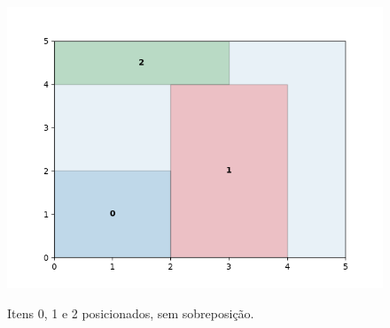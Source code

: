 \begin{figure}[H]
    \centering
    \caption{Itens 0, 1 e 2 posicionados, sem sobreposição.}
    \includegraphics[scale=0.5]{utils/images/continuous_example3}
    \label{fig:sobreposicao-dominio3}
\end{figure}
